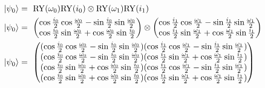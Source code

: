 \begin{equation}
    \centering
    \begin{split}
        \ket{\psi_0} &=\ \mathrm{RY}(\omega_0)\mathrm{RY}(i_0) \otimes \mathrm{RY}(\omega_1)\mathrm{RY}(i_1) \\ 
        \ket{\psi_0} &=\ \begin{pmatrix}
            \cos\frac{i_{0}}{2}\cos\frac{\omega_{0}}{2} - \sin\frac{i_{0}}{2}\sin\frac{\omega_{0}}{2}\\
            \cos\frac{i_{0}}{2}\sin\frac{\omega_{0}}{2} + \cos\frac{\omega_{0}}{2}\sin\frac{i_{0}}{2}\\
        \end{pmatrix} \otimes 
        \begin{pmatrix}
            \cos\frac{i_{1}}{2}\cos\frac{\omega_{1}}{2} - \sin\frac{i_{1}}{2}\sin\frac{\omega_{1}}{2}\\
            \cos\frac{i_{1}}{2}\sin\frac{\omega_{1}}{2} + \cos\frac{\omega_{1}}{2}\sin\frac{i_{1}}{2}\\
        \end{pmatrix} \\
        \ket{\psi_0} &=\ \begin{pmatrix}
     (\cos\frac{i_{0}}{2}\cos\frac{\omega_{0}}{2} - \sin\frac{i_{0}}{2}\sin\frac{\omega_{0}}{2})(\cos\frac{i_{1}}{2}\cos\frac{\omega_{1}}{2} - \sin\frac{i_{1}}{2}\sin\frac{\omega_{1}}{2})\\
     (\cos\frac{i_{0}}{2}\cos\frac{\omega_{0}}{2} - \sin\frac{i_{0}}{2}\sin\frac{\omega_{0}}{2})(\cos\frac{i_{1}}{2}\sin\frac{\omega_{1}}{2} + \cos\frac{\omega_{1}}{2}\sin\frac{i_{1}}{2})\\
     (\cos\frac{i_{0}}{2}\sin\frac{\omega_{0}}{2} + \cos\frac{\omega_{0}}{2}\sin\frac{i_{0}}{2})(\cos\frac{i_{1}}{2}\cos\frac{\omega_{1}}{2} - \sin\frac{i_{1}}{2}\sin\frac{\omega_{1}}{2})\\
     (\cos\frac{i_{0}}{2}\sin\frac{\omega_{0}}{2} + \cos\frac{\omega_{0}}{2}\sin\frac{i_{0}}{2})(\cos\frac{i_{1}}{2}\sin\frac{\omega_{1}}{2} + \cos\frac{\omega_{1}}{2}\sin\frac{i_{1}}{2})\\
    \end{pmatrix}
    \end{split}
    \label{equation:tensor_product_two_qubits}
\end{equation}

